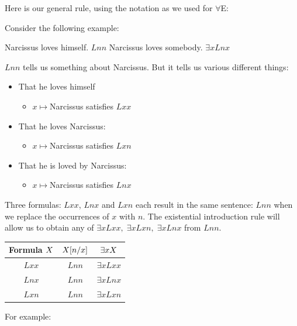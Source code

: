 Here is our general rule, using the notation as we used for $\forall$E:
\begin{highlighted}
	\begin{fitchproof}
		 
	\end{fitchproof}
\end{highlighted}

Consider the following example: 
\begin{earg}
	\prem Narcissus loves himself. $Lnn$
	\conc Narcissus loves somebody. $\exists x Lnx$
\end{earg} 

$Lnn$ tells us something about Narcissus. But it tells us various different things:
\begin{itemize}
	\item That he loves himself
	\begin{itemize}
		\item $x\mapsto$Narcissus satisfies $Lxx$
	\end{itemize}
	\item That he loves Narcissus: \begin{itemize}
		\item $x\mapsto$Narcissus satisfies $Lxn$
	\end{itemize}
	\item That he is loved by Narcissus: \begin{itemize}
		\item $x\mapsto$Narcissus satisfies $Lnx$
	\end{itemize}
\end{itemize}

Three formulas: $Lxx$, $Lnx$ and $Lxn$ each result in the same sentence: $Lnn$ when we replace the occurrences of $x$ with $n$. The existential introduction rule will allow us to obtain any of $\exists x Lxx,\; \exists x Lxn,\; \exists x Lnx$ from $Lnn$.

\begin{center}
	\begin{tabular}{c|c|c}
	Formula $X$&$X[n/x]$&$\exists x X$\\\hline
	$Lxx$&$Lnn$&$\exists x Lxx$\\
	$Lnx$&$Lnn$&$\exists x Lnx$\\
	$Lxn$&$Lnn$&$\exists x Lxn$
\end{tabular}
\end{center}

For example: 
\begin{fitchproof}
	\hypo{a}{L\yellowbox{n}n}
	 \existsI{a}
\end{fitchproof}

